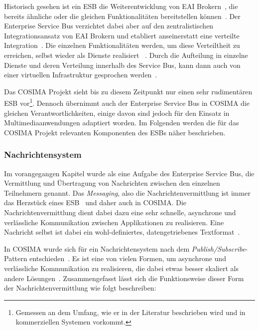   Historisch gesehen ist ein ESB die Weiterentwicklung von EAI Brokern~, die bereits ähnliche oder die gleichen Funktionalitäten bereitstellen können~\citep[S. 146]{masak2007ssb}. Der Enterprise Service Bus verzichtet dabei aber auf den zentralistischen Integrationsansatz von EAI Brokern und etabliert anseinerstatt eine verteilte Integration~\citep[S. 4]{enterprise_service_bus}. Die einzelnen Funktionalitäten werden, um diese Verteiltheit zu erreichen, selbst wieder als Dienste realisiert ~\citep{enterprise_service_bus,masak2007ssb,papazoglou2007soc}. Durch die Aufteilung in einzelne Dienste und deren Verteilung innerhalb des Service Bus, kann dann auch von einer virtuellen Infrastruktur gesprochen werden~\citep[S. 136]{soa_goes_real}.
  
  Das COSIMA Projekt sieht bis zu diesem Zeitpunkt nur einen sehr rudimentären ESB vor\footnote{Gemessen an dem Umfang, wie er in der Literatur beschrieben wird und in kommerziellen Systemen vorkommt.}. Dennoch übernimmt auch der Enterprise Service Bus in COSIMA die gleichen Verantwortlichkeiten, einige davon sind jedoch für den Einsatz in Multimediaanwendungen adaptiert worden. Im Folgenden werden die für das COSIMA Projekt relevanten Komponenten des ESBs näher beschrieben.
  
\subsubsection{Nachrichtensystem} %
\label{ssub:nachrichtensystem}
  
  Im vorangegangen Kapitel wurde als eine Aufgabe des Enterprise Service Bus, die Vermittlung und Übertragung von Nachrichten zwischen den einzelnen Teilnehmern genannt. Das \emph{Messaging}, also die Nachrichtenvermittlung ist immer das Herzstück eines ESB~\citep[S. 77]{enterprise_service_bus} und daher auch in COSIMA. Die Nachrichtenvermittlung dient dabei dazu eine sehr schnelle, asynchrone und verlässliche Kommunikation zwischen Applikationen zu realisieren. Eine Nachricht selbst ist dabei ein wohl-definiertes, datengetriebenes Textformat~\citep[S. 60f]{web_services_principles_and_technology}.
  
  In COSIMA wurde sich für ein Nachrichtensystem nach dem \emph{Publish/Subscribe}-Pattern entschieden~\citep[S. 106]{enterprise_integration_patterns}. Es ist eine von vielen Formen, um asynchrone und verlässliche Kommunikation zu realisieren, die dabei etwas besser skaliert als andere Lösungen~\citep[S. 69]{web_services_principles_and_technology}. Zusammengefasst lässt sich die Funktionsweise dieser Form der Nachrichtenvermittlung wie folgt beschreiben:
  
